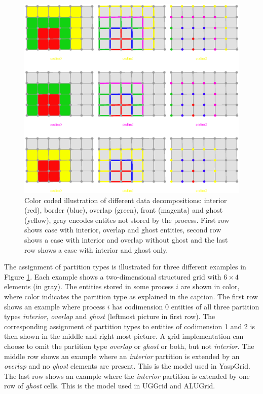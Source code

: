 \documentclass[11pt,a4paper,headinclude,footinclude,DIV16,normalheadings]{scrreprt}
\begin{document}
\begin{figure}

\centering
\includegraphics[width=\textwidth]{./EPS/partitionsingle}

\caption{Color coded illustration of different data decompositions:
  interior (red), border (blue), overlap (green), front (magenta) and
  ghost (yellow), gray encodes entites not stored by the
  process. First row shows case with interior, overlap and ghost
  entities, second row shows a case with interior and overlap without
  ghost and the last row shows a case with interior and ghost only.}
\label{Fig:PartitionSingle}
\end{figure}

The assignment of partition types is illustrated for three different
examples in Figure \ref{Fig:PartitionSingle}. Each example shows a
two-dimensional structured grid with $6\times 4$ elements (in
gray). The entities stored in some process $i$ are shown in color,
where color indicates the partition type as explained in the
caption. The first row shows an example where process $i$ has
codimension 0 entities of all three partition types \textit{interior},
\textit{overlap} and \textit{ghost} (leftmost picture in first
row). The corresponding assignment of partition types to entities of
codimension 1 and 2 is then shown in the middle and right most
picture. A grid implementation can choose to omit the partition type
\textit{overlap}  or \textit{ghost} or both, but not
\textit{interior}. The middle row shows an example where an
\textit{interior} partition is extended by an \textit{overlap} and no
\textit{ghost} elements are present. This is the model used in
YaspGrid. The last row shows an example where the \textit{interior} partition
is extended by one row of  \textit{ghost} cells. This is the model
used in UGGrid and ALUGrid. 
\end{document}

